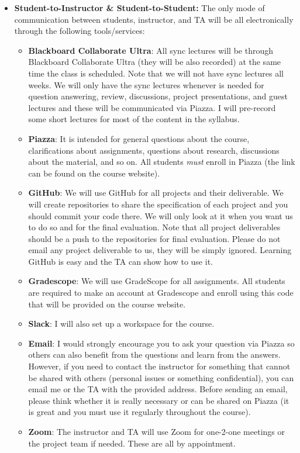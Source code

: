 \documentclass[11pt]{article}
\begin{document}
\begin{itemize}
\item \textbf{Student-to-Instructor \& Student-to-Student:} The only mode of communication between students, instructor, and TA will be all electronically through the following tools/services:
\begin{itemize}
  \item \textbf{Blackboard Collaborate Ultra}: All sync lectures will be through Blackboard Collaborate Ultra (they will be also recorded) at the same time the class is scheduled. Note that we will not have sync lectures all weeks. We will only have the sync lectures whenever is needed for question answering, review, discussions, project presentations, and guest lectures and these will be communicated via Piazza. I will pre-record some short lectures for most of the content in the syllabus.
  \item \textbf{Piazza}: It is intended for general questions about the course, clarifications about assignments, questions about research, discussions about the material, and so on. All students \emph{must} enroll in Piazza (the link can be found on the course website).
  \item \textbf{GitHub}: We will use GitHub for all projects and their deliverable. We will create repositories to share the specification of each project and you should commit your code there. We will only look at it when you want us to do so and for the final evaluation. Note that all project deliverables should be a push to the repositories for final evaluation. Please do not email any project deliverable to us, they will be simply ignored. Learning GitHub is easy and the TA can show how to use it.
  \item \textbf{Gradescope}: We will use GradeScope for all assignments. All students are required to make an account at Gradescope and enroll using this code that will be provided on the course website.
  \item \textbf{Slack}: I will also set up a workspace for the course.
  \item \textbf{Email}: I would strongly encourage you to ask your question via Piazza so others can also benefit from the questions and learn from the answers. However, if you need to contact the instructor for something that cannot be shared with others (personal issues or something confidential), you can email me or the TA with the provided address. Before sending an email, please think whether it is really necessary or can be shared on Piazza (it is great and you must use it regularly throughout the course).
  \item \textbf{Zoom}: The instructor and TA will use Zoom for one-2-one meetings or the project team if needed. These are all by appointment.
\end{itemize}



\end{itemize}
\end{document}
